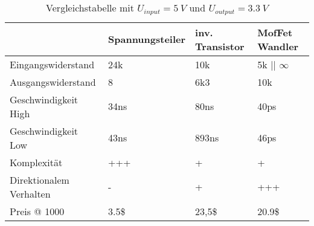 \begin{frame}[c]{}


  \begin{table}
    \small
    \begin{tabular}{l|l|l|l}
      & Spannungsteiler & inv. Transistor & MofFet Wandler \\
      \hline 
      Eingangswiderstand        & 24k   & 10k    & 5k || $\infty$ \\
      Ausgangswiderstand        & 8     & 6k3    & 10k \\
      Geschwindigkeit High      & 34ns  & 80ns   & 40ps \\
      Geschwindigkeit Low       & 43ns  & 893ns  & 46ps \\
      Komplexität               & +++   & +      & +  \\
      Direktionalem Verhalten   & -     & +      & +++ \\
      Preis @ 1000              & 3.5\$ & 23,5\$ & 20.9\$ \\
    \end{tabular}
    \caption{Vergleichstabelle mit $U_{input} = \SI {5}{V} $ und $U_{output} = \SI {3.3}{V} $}
    \label{table:tabelle-vergleich1}
  
  \end{table}
    
\end{frame}
